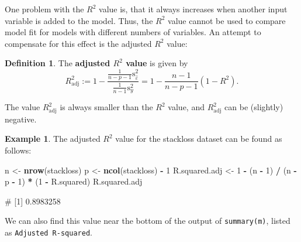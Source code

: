 \documentclass[
  a4paper,
]{article}
\newenvironment{Shaded}{\begin{snugshade}}{\end{snugshade}}
\newcommand{\DecValTok}[1]{\textcolor[rgb]{0.00,0.00,0.81}{#1}}
\newcommand{\FunctionTok}[1]{\textcolor[rgb]{0.13,0.29,0.53}{\textbf{#1}}}
\newcommand{\NormalTok}[1]{#1}
\newcommand{\OtherTok}[1]{\textcolor[rgb]{0.56,0.35,0.01}{#1}}
\newcommand{\SpecialCharTok}[1]{\textcolor[rgb]{0.81,0.36,0.00}{\textbf{#1}}}
\theoremstyle{definition}
\newtheorem{definition}{Definition}[section]
\theoremstyle{definition}
\newtheorem{example}{Example}[section]
\theoremstyle{definition}
\theoremstyle{definition}
\theoremstyle{remark}
\begin{document}
One problem with the \(R^2\) value is, that it always increases when another
input variable is added to the model. Thus, the \(R^2\) value cannot be used
to compare model fit for models with different numbers of variables. An
attempt to compensate for this effect is the adjusted \(R^2\) value:

\begin{definition}
\protect\hypertarget{def:adjusted-R-squared}{}\label{def:adjusted-R-squared}The \textbf{adjusted \(R^2\) value} is given by
\begin{equation*}
  R^2_\mathrm{adj}
  := 1 - \frac{\frac{1}{n-p-1}\mathrm{s}_{\hat\varepsilon}^2}{\frac{1}{n-1}\mathrm{s}_y^2}
  = 1 - \frac{n-1}{n-p-1}(1 - R^2).
\end{equation*}
\end{definition}

The value \(R^2_\mathrm{adj}\) is always smaller than the \(R^2\) value, and
\(R^2_\mathrm{adj}\) can be (slightly) negative.

\begin{example}
The adjusted \(R^2\) value for the stackloss dataset
can be found as follows:

\begin{Shaded}
\begin{Highlighting}[]
\NormalTok{n }\OtherTok{\textless{}{-}} \FunctionTok{nrow}\NormalTok{(stackloss)}
\NormalTok{p }\OtherTok{\textless{}{-}} \FunctionTok{ncol}\NormalTok{(stackloss) }\SpecialCharTok{{-}} \DecValTok{1}
\NormalTok{R.squared.adj }\OtherTok{\textless{}{-}} \DecValTok{1} \SpecialCharTok{{-}}\NormalTok{ (n }\SpecialCharTok{{-}} \DecValTok{1}\NormalTok{) }\SpecialCharTok{/}\NormalTok{ (n }\SpecialCharTok{{-}}\NormalTok{ p }\SpecialCharTok{{-}} \DecValTok{1}\NormalTok{) }\SpecialCharTok{*}\NormalTok{ (}\DecValTok{1} \SpecialCharTok{{-}}\NormalTok{ R.squared)}
\NormalTok{R.squared.adj}
\end{Highlighting}
\end{Shaded}

\begin{Shaded}
\begin{Highlighting}[]
\NormalTok{\# [1] 0.8983258}
\end{Highlighting}
\end{Shaded}

We can also find this value near the bottom of the output of
\texttt{summary(m)}, listed as \texttt{Adjusted\ R-squared}.
\end{example}
\end{document}
